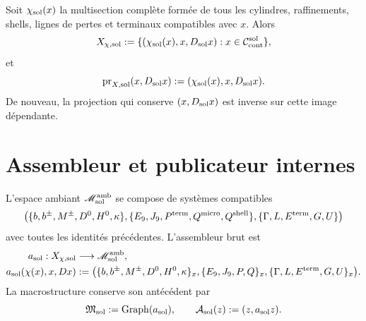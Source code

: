Soit \(\chi_{\rm sol}(x)\) la multisection complète formée de tous les
cylindres, raffinements, shells, lignes de pertes et terminaux compatibles
avec \(x\). Alors
\begin{equation}\label{eq:pdfv2-sol-xchi}
 X_{\chi,{\rm sol}}
 :=\{(\chi_{\rm sol}(x),x,D_{\rm sol}x):
 x\in\mathcal C_{\rm cont}^{\rm sol}\},
\end{equation}
et
\begin{equation}\label{eq:pdfv2-sol-prx}
 \operatorname{pr}_{X,{\rm sol}}(x,D_{\rm sol}x)
 :=(\chi_{\rm sol}(x),x,D_{\rm sol}x).
\end{equation}
De nouveau, la projection qui conserve \((x,D_{\rm sol}x)\) est inverse sur
cette image dépendante.

\section{Assembleur et publicateur internes}
\label{sec:pdfv2-sol-assembler-publisher}

L'espace ambiant \(\mathscr M_{\rm sol}^{\rm amb}\) se compose de systèmes
compatibles
\[
 \bigl(
 \{b,b^\pm,M^\pm,D^0,H^0,\kappa\},
 \{E_9,J_9,P^{\rm term},Q^{\rm micro},Q^{\rm shell}\},
 \{\Gamma,L,E^{\rm term},G,U\}
 \bigr)
\]
avec toutes les identités précédentes. L'assembleur brut est
\begin{equation}\label{eq:pdfv2-sol-assembler}
 \begin{aligned}
 a_{\rm sol}:X_{\chi,{\rm sol}}&\longrightarrow
 \mathscr M_{\rm sol}^{\rm amb},\\
 a_{\rm sol}(\chi(x),x,Dx)&:=
 \bigl(
 \{b,b^\pm,M^\pm,D^0,H^0,\kappa\}_x,
 \{E_9,J_9,P,Q\}_x,
 \{\Gamma,L,E^{\rm term},G,U\}_x
 \bigr).
 \end{aligned}
\end{equation}
La macrostructure conserve son antécédent par
\begin{equation}\label{eq:pdfv2-sol-macro-graph}
 \mathfrak M_{\rm sol}:=\operatorname{Graph}(a_{\rm sol}),
 \qquad
 \mathcal A_{\rm sol}(z):=(z,a_{\rm sol}z).
\end{equation}

